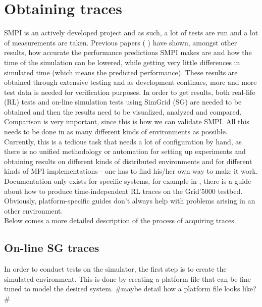 \section{Obtaining traces}
SMPI is an actively developed project and as such, a lot of tests are
run and a lot of measurements are taken. Previous papers
(\cite{csgscq11} \cite{bdglmqssv13}) have shown, amongst other
results, how accurate the performance predictions SMPI makes are and
how the time of the simulation can be lowered, while getting very
little differences in simulated time (which means the predicted
performance). These results are obtained through extensive testing and
as development continues, more and more test data is needed for
verification purposes. In order to get results, both
real-life (RL) tests and on-line simulation tests using SimGrid (SG)
are needed to be obtained and then the results need to be visualized,
analyzed and compared. Comparison is very important, since this is how
we can validate SMPI. All this needs to be done in as many different
kinds of environments as possible. Currently, this is a tedious task
that needs a lot of configuration by hand, as there is no unified
methodology or automation for setting up experiments and obtaining
results on
different kinds of distributed environments and for different kinds of
MPI implementations - one has to find his/her own way to make it
work. Documentation only exists for specific systems, for example in
\cite{ms11}, there is a guide about how to produce time-independent RL
traces on the Grid'5000 testbed. Obviously, platform-specific guides
don't always help with problems arising in an other environment.\\
Below comes a more detailed description of the process of acquiring
traces.
\subsection{On-line SG traces}
In order to conduct tests on the simulator, the first step is to
create the simulated environment. This is done by creating a platform
file that can be fine-tuned to model the desired system. \#maybe
detail how a platform file looks like?\#
